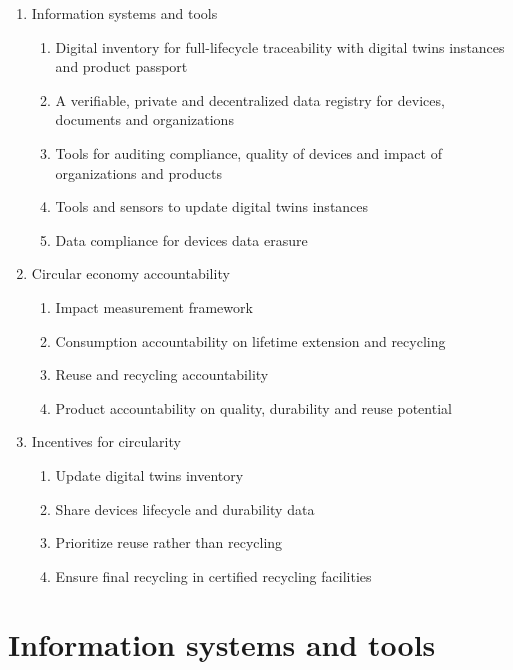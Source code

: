 \documentclass[
]{book}
\begin{document}
\begin{enumerate}
\def\labelenumi{\alph{enumi}.}
\item
  Information systems and tools

  \begin{enumerate}
  \def\labelenumii{\arabic{enumii}.}
  \item
    Digital inventory for full-lifecycle traceability with digital twins instances and product passport
  \item
    A verifiable, private and decentralized data registry for devices, documents and organizations
  \item
    Tools for auditing compliance, quality of devices and impact of organizations and products
  \item
    Tools and sensors to update digital twins instances
  \item
    Data compliance for devices data erasure
  \end{enumerate}
\item
  Circular economy accountability

  \begin{enumerate}
  \def\labelenumii{\arabic{enumii}.}
  \item
    Impact measurement framework
  \item
    Consumption accountability on lifetime extension and recycling
  \item
    Reuse and recycling accountability
  \item
    Product accountability on quality, durability and reuse potential
  \end{enumerate}
\item
  Incentives for circularity

  \begin{enumerate}
  \def\labelenumii{\arabic{enumii}.}
  \item
    Update digital twins inventory
  \item
    Share devices lifecycle and durability data
  \item
    Prioritize reuse rather than recycling
  \item
    Ensure final recycling in certified recycling facilities
  \end{enumerate}
\end{enumerate}

\hypertarget{information-systems-and-tools}{%
\section{Information systems and tools}\label{information-systems-and-tools}}
\end{document}
